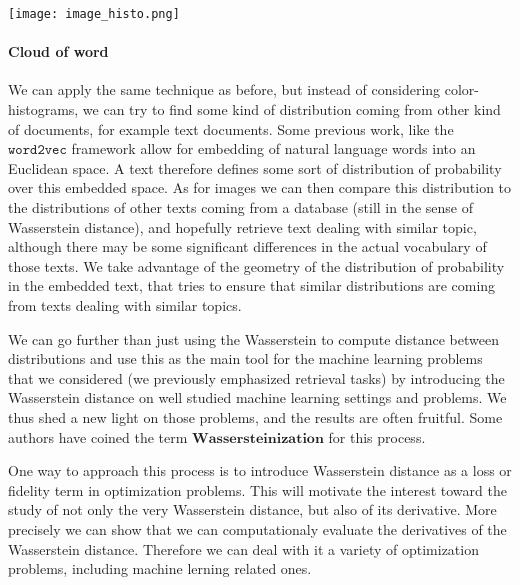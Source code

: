\begin{center}
	\texttt{[image: image\_histo.png]}
\end{center}


\paragraph{Cloud of word}

We can apply the same technique as before, but instead of considering
color-histograms, we can try to find some kind of distribution coming from
other kind of documents, for example text documents. Some previous work,
like the $\texttt{word2vec}$ framework allow for embedding of natural
language words into an Euclidean space. A text therefore defines some sort
of distribution of probability over this embedded space. As for images we
can then compare this distribution to the distributions of other texts coming
from a database (still in the sense of Wasserstein distance), and hopefully
retrieve text dealing with similar topic, although there may be some
significant differences in the actual vocabulary of those texts. We take
advantage of the geometry of the distribution of probability in the embedded
text, that tries to ensure that similar distributions are coming from texts
dealing with similar topics.


We can go further than just using the Wasserstein to compute distance between
distributions and use this as the main tool for the machine learning problems
that we considered (we previously emphasized retrieval tasks) by introducing
the Wasserstein distance on well studied machine learning settings and
problems. We thus shed a new light on those problems, and the results are
often fruitful. Some authors have coined the term $\textbf{Wassersteinization}$
for this process.


One way to approach this process is to introduce Wasserstein distance as a
loss or fidelity term in optimization problems. This will motivate the interest
toward the study of not only the very Wasserstein distance, but also of its
derivative. More precisely we can show that we can computationaly evaluate
the derivatives of the Wasserstein distance. Therefore we can deal with it a variety of optimization problems, including machine lerning related ones.


